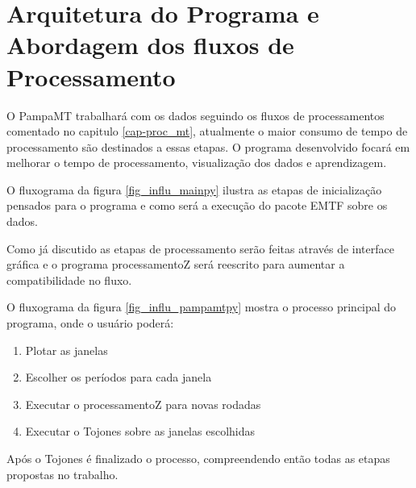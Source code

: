     \section{Arquitetura do Programa e Abordagem dos fluxos de Processamento}
        \label{cap-algoritmos}
    
    
    O PampaMT trabalhará com os dados seguindo os fluxos de processamentos comentado no capitulo \ref{cap-proc_mt}, atualmente o maior consumo de tempo de processamento são destinados a essas etapas. O programa desenvolvido focará em melhorar o tempo de processamento, visualização dos dados e aprendizagem.
    
    O fluxograma da figura \ref{fig_influ_mainpy} ilustra as etapas de inicialização pensados para o programa e como será a execução do pacote EMTF sobre os dados.
    
    Como já discutido as etapas de processamento serão feitas através de interface gráfica e o programa processamentoZ será reescrito para aumentar a compatibilidade no fluxo.
    
    O fluxograma da figura \ref{fig_influ_pampamtpy} mostra o processo principal do programa, onde o usuário poderá:
    \begin{enumerate}
     \item Plotar as janelas
     \item Escolher os períodos para cada janela
     \item Executar o processamentoZ para novas rodadas
     \item Executar o Tojones sobre as janelas escolhidas
    \end{enumerate}

    Após o Tojones é finalizado o processo, compreendendo então todas as etapas propostas no trabalho.
    
  
    
    
    
